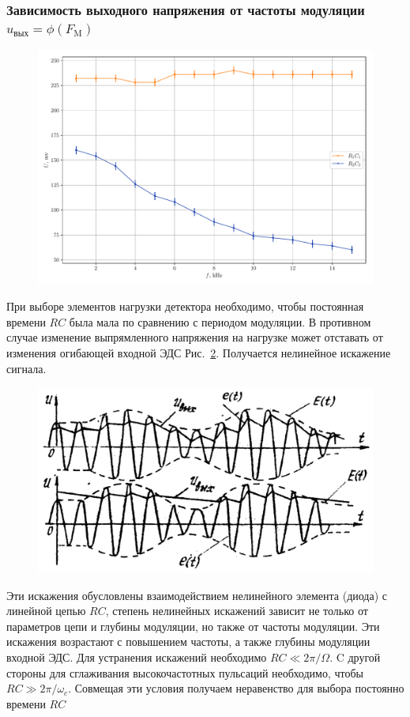 \subsubsection{Зависимость выходного напряжения от частоты модуляции  $u_{\text{вых}} = \phi(F_{\text{M}})$}
\begin{figure}
	\centering
	\includegraphics[width=0.8\linewidth]{plots/exp3b.pdf}
	\caption{}
	\label{exp:3.3}
\end{figure}
При выборе элементов нагрузки детектора необходимо, чтобы постоянная времени $RC$ была мала по сравнению с периодом модуляции. В противном случае изменение выпрямленного напряжения на нагрузке может отставать от изменения огибающей входной ЭДС Рис.~\ref{pic:11}. Получается нелинейное искажение сигнала. 
\begin{figure}[h!]
	\centering
	\includegraphics[width=0.8\linewidth]{picture/pic11.jpg}
	\caption{}
	\label{pic:11}
\end{figure}
Эти искажения обусловлены взаимодействием нелинейного элемента (диода) с линейной цепью $RC$, степень нелинейных искажений зависит не только от параметров цепи и глубины модуляции, но также от частоты модуляции. Эти искажения возрастают с повышением частоты, а также глубины модуляции входной ЭДС. Для устранения искажений необходимо $RC\ll2\pi/\Omega$. C другой стороны для сглаживания высокочастотных пульсаций необходимо, чтобы $RC\gg2\pi/\omega_c$. Совмещая эти условия получаем неравенство для выбора постоянно времени $RC$
